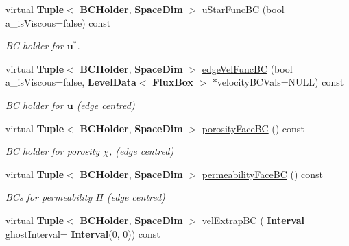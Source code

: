 \begin{DoxyCompactItemize}
\mbox{\label{class_phys_b_c_util_a33c3a4bf7388455545a5ec5ce14f1748}} 
virtual \textbf{ Tuple}$<$ \textbf{ B\+C\+Holder}, \textbf{ Space\+Dim} $>$ \hyperlink{class_phys_b_c_util_a33c3a4bf7388455545a5ec5ce14f1748}{u\+Star\+Func\+BC} (bool a\+\_\+is\+Viscous=false) const
\begin{DoxyCompactList}\small\item\em BC holder for $ \mathbf{u}^* $. \end{DoxyCompactList}\item 
\mbox{\label{class_phys_b_c_util_ad84eb5aadb6e8a2c4787771362ff652f}} 
virtual \textbf{ Tuple}$<$ \textbf{ B\+C\+Holder}, \textbf{ Space\+Dim} $>$ \hyperlink{class_phys_b_c_util_ad84eb5aadb6e8a2c4787771362ff652f}{edge\+Vel\+Func\+BC} (bool a\+\_\+is\+Viscous=false, \textbf{ Level\+Data}$<$ \textbf{ Flux\+Box} $>$ $\ast$velocity\+B\+C\+Vals=N\+U\+LL) const
\begin{DoxyCompactList}\small\item\em BC holder for $ \mathbf{u} $ (edge centred) \end{DoxyCompactList}\item 
\mbox{\label{class_phys_b_c_util_ac2e74bc92a09f6975e924ebe8de9c776}} 
virtual \textbf{ Tuple}$<$ \textbf{ B\+C\+Holder}, \textbf{ Space\+Dim} $>$ \hyperlink{class_phys_b_c_util_ac2e74bc92a09f6975e924ebe8de9c776}{porosity\+Face\+BC} () const
\begin{DoxyCompactList}\small\item\em BC holder for porosity $ \chi $, (edge centred) \end{DoxyCompactList}\item 
\mbox{\label{class_phys_b_c_util_a0b7ada710021d11b2957b938d49680f9}} 
virtual \textbf{ Tuple}$<$ \textbf{ B\+C\+Holder}, \textbf{ Space\+Dim} $>$ \hyperlink{class_phys_b_c_util_a0b7ada710021d11b2957b938d49680f9}{permeability\+Face\+BC} () const
\begin{DoxyCompactList}\small\item\em B\+Cs for permeability $ \Pi $ (edge centred) \end{DoxyCompactList}\item 
\mbox{\label{class_phys_b_c_util_a111f6b2f38e223c429ecf11c8ee57891}} 
virtual \textbf{ Tuple}$<$ \textbf{ B\+C\+Holder}, \textbf{ Space\+Dim} $>$ \hyperlink{class_phys_b_c_util_a111f6b2f38e223c429ecf11c8ee57891}{vel\+Extrap\+BC} (\textbf{ Interval} ghost\+Interval=\textbf{ Interval}(0, 0)) const

\end{DoxyCompactItemize}
